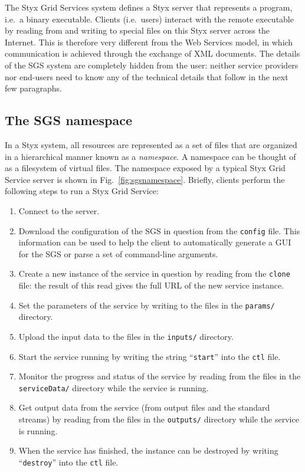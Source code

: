 \documentclass{llncs}
\begin{document}
The Styx Grid Services system defines a Styx server that represents a program, i.e.\ a binary executable.  Clients (i.e.\ users) interact with the remote executable by reading from and writing to special files on this Styx server across the Internet.  This is therefore very different from the Web Services model, in which communication is achieved through the exchange of XML documents.  The details of the SGS system are completely hidden from the user: neither service providers nor end-users need to know any of the technical details that follow in the next few paragraphs.

\subsection{The SGS namespace}
In a Styx system, all resources are represented as a set of files that are organized in a hierarchical manner known as a {\em namespace\/}.  A namespace can be thought of as a filesystem of virtual files.  The namespace exposed by a typical Styx Grid Service server is shown in Fig.~\ref{fig:sgsnamespace}.  Briefly, clients perform the following steps to run a Styx Grid Service:
\begin{enumerate}
	\item Connect to the server.
	\item Download the configuration of the SGS in question from the {\tt config} file.  This information can be used to help the client to automatically generate a GUI for the SGS or parse a set of command-line arguments.
	\item Create a new instance of the service in question by reading from the {\tt clone} file: the result of this read gives the full URL of the new service instance.
	\item Set the parameters of the service by writing to the files in the {\tt params/} directory.
	\item Upload the input data to the files in the {\tt inputs/} directory.
	\item Start the service running by writing the string ``{\tt start}'' into the {\tt ctl} file.
	\item Monitor the progress and status of the service by reading from the files in the {\tt serviceData/} directory while the service is running.
	\item Get output data from the service (from output files and the standard streams) by reading from the files in the {\tt outputs/} directory while the service is running.
	\item When the service has finished, the instance can be destroyed by writing ``{\tt destroy}'' into the {\tt ctl} file.
\end{enumerate}
\end{document}
